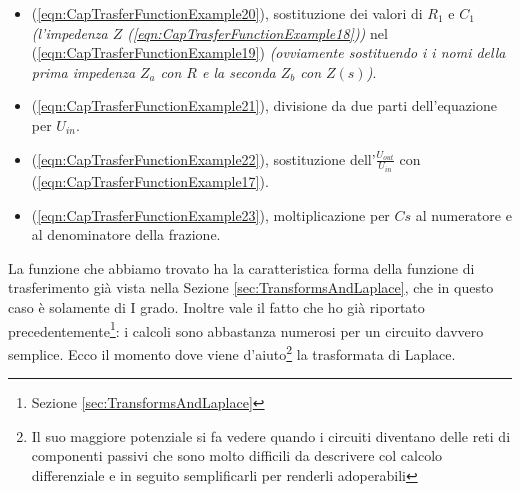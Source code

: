 \documentclass[a4paper, 10pt, final]{article} %
\begin{document}
    \begin{itemize}
        \item (\ref{eqn:CapTrasferFunctionExample20}), sostituzione dei valori di $R_1$ e $C_1$ \emph{(l'impedenza $Z$ (\ref{eqn:CapTrasferFunctionExample18}))} nel (\ref{eqn:CapTrasferFunctionExample19}) \emph{(ovviamente sostituendo i i nomi della prima impedenza $Z_a$ con $R$ e la seconda $Z_b$ con $Z(s)$)}.
        \item (\ref{eqn:CapTrasferFunctionExample21}), divisione da due parti dell'equazione per $U_{in}$.
        \item (\ref{eqn:CapTrasferFunctionExample22}), sostituzione dell'$\frac{U_{out}}{U_{in}}$ con (\ref{eqn:CapTrasferFunctionExample17}).
        \item (\ref{eqn:CapTrasferFunctionExample23}), moltiplicazione per $C s$ al numeratore e al denominatore della frazione.
    \end{itemize}
    \noindent La funzione che abbiamo trovato ha la caratteristica forma della funzione di trasferimento gi\`{a} vista nella Sezione \ref{sec:TransformsAndLaplace}, che in questo caso \`{e} solamente di I grado.
    Inoltre vale il fatto che ho gi\`{a} riportato precedentemente\footnote{Sezione \ref{sec:TransformsAndLaplace}}: i calcoli sono abbastanza numerosi per un circuito davvero semplice. 
    Ecco il momento dove viene d'aiuto\footnote{Il suo maggiore potenziale si fa vedere quando i circuiti diventano delle reti di componenti passivi che sono molto difficili da descrivere col calcolo differenziale e in seguito semplificarli per renderli adoperabili} la trasformata di Laplace.
\end{document}
